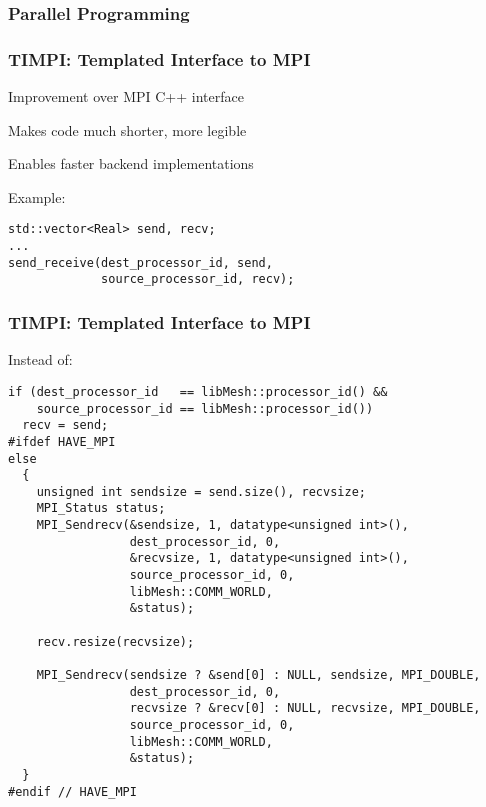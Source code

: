 
\subsubsection{Parallel Programming}
\begin{frame}[fragile]
\frametitle{TIMPI: Templated Interface to MPI}
\item Improvement over MPI C++ interface
\item Makes code much shorter, more legible
\item Enables faster backend implementations
\royitemizeend

Example:
\small
\begin{lstlisting}
std::vector<Real> send, recv;
...
send_receive(dest_processor_id, send,
             source_processor_id, recv);
\end{lstlisting}
\end{frame}



\begin{frame}
\frametitle{TIMPI: Templated Interface to MPI}

Instead of:
\begin{lstlisting}
if (dest_processor_id   == libMesh::processor_id() &&
    source_processor_id == libMesh::processor_id())
  recv = send;
#ifdef HAVE_MPI
else
  {
    unsigned int sendsize = send.size(), recvsize;
    MPI_Status status;
    MPI_Sendrecv(&sendsize, 1, datatype<unsigned int>(),
                 dest_processor_id, 0,
                 &recvsize, 1, datatype<unsigned int>(),
                 source_processor_id, 0,
                 libMesh::COMM_WORLD,
                 &status);

    recv.resize(recvsize);

    MPI_Sendrecv(sendsize ? &send[0] : NULL, sendsize, MPI_DOUBLE,
                 dest_processor_id, 0,
                 recvsize ? &recv[0] : NULL, recvsize, MPI_DOUBLE,
                 source_processor_id, 0,
                 libMesh::COMM_WORLD,
                 &status);
  }
#endif // HAVE_MPI
\end{lstlisting}
\end{frame}


